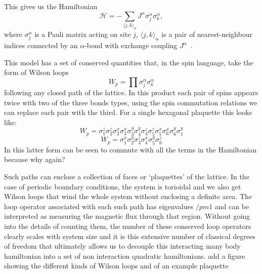 This gives us the Hamiltonian
\begin{equation}
    \label{eqn:kitham}
    \mathcal{H} =  - \sum_{\langle j,k\rangle_\alpha} J^{\alpha}\sigma_j^{\alpha}\sigma_k^{\alpha},
\end{equation}
where $\sigma^\alpha_j$ is a Pauli matrix acting on site $j$, \(\langle j,k\rangle_\alpha\) is a pair of nearest-neighbour indices connected by an $\alpha$-bond with exchange coupling $J^\alpha$~\cite{kitaevAnyonsExactlySolved2006}.

This model has a set of conserved quantities that, in the spin language, take the form of Wilson loops 
\begin{equation}
W_p = \prod \sigma_j^{\alpha}\sigma_k^{\alpha}
\end{equation}
following any closed path of the lattice. In this product each pair of spins appears twice with two of the three bonds types, using the spin commutation relations we can replace each pair with the third. For a single hexagonal plaquette this looks like:
\begin{equation}
W_p = \sigma_1^{z}\sigma_2^{z} \sigma_2^{x}\sigma_3^{x} \sigma_3^{y}\sigma_4^{y} \sigma_4^{z}\sigma_5^{z} \sigma_5^{x}\sigma_6^{x} \sigma_6^{y}\sigma_1^{y}
\end{equation}
\begin{equation}
W_p = \sigma_1^{x}\sigma_2^{y} \sigma_3^{z} \sigma_4^{x} \sigma_5^{y}\sigma_6^{z}
\end{equation}
In this latter form can be seen to commute with all the terms in the Hamiltonian because {\color{red} why again?}

Such paths can enclose a collection of faces or `plaquettes' of the lattice. In the case of periodic boundary conditions, the system is torioidal and we also get Wilson loops that wind the whole system without enclosing a definite area. The loop operator associated with each such path has eigenvalues $/pm 1$ and can be interpreted as measuring the magnetic flux through that region. Without going into the details of counting them, the number of these conserved loop operators clearly scales with system size and it is this extensive number of classical degrees of freedom that ultimately allows us to decouple this interacting many body hamiltonian into a set of non interaction quadratic hamiltonians. {\color{red} add a figure showing the different kinds of Wilson loops and of an example plaquette}

